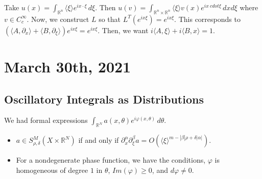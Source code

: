\documentclass[12pt]{scrartcl}
\newcommand{\R}{\mathbb{R}}
\newcommand{\<}{\langle}
\renewcommand{\>}{\rangle}
\let \phi \varphi
\begin{document}
\begin{example} Take $u(x) = \int_{\R^n} \<\xi\>e^{ix \cdot \xi}\,d\xi$.  Then $u(v) = \int_{\R^n \times \R^n} \<\xi\>v(x) e^{ix\ cdot \xi} \,dx d\xi$ where $v \in C_c^\infty$.  Now, we construct $L$ so that $L^T(e^{ix\xi}) = e^{ix\xi}$.  This corresponds to $(\<A, \partial_x\> + \<B, \partial_\xi\>)e^{ix\xi} = e^{ix\xi}$.  Then, we want $i\<A, \xi\> + i\<B, x\> = 1$.  
\end{example}
\pagebreak
\section{March 30th, 2021}
\subsection{Oscillatory Integrals as Distributions}
We had formal expressions $\int_{\R^N} a(x, \theta) e^{i\phi(x, \theta)}\, d\theta$.  
\begin{itemize}
\item $a \in S_{\rho, \delta}^M(X \times \R^N)$ if and only if $\partial_x^\alpha \partial_\xi^\beta a = O(\<\xi\>^{m - |\beta|\rho + \delta|\alpha|})$.
\item For a nondegenerate phase function, we have the conditions, $\phi$ is homogeneous of degree $1$ in $\theta$, $Im(\phi) \ge 0$, and $d\phi \ne 0$.
\end{itemize}
\end{document}
